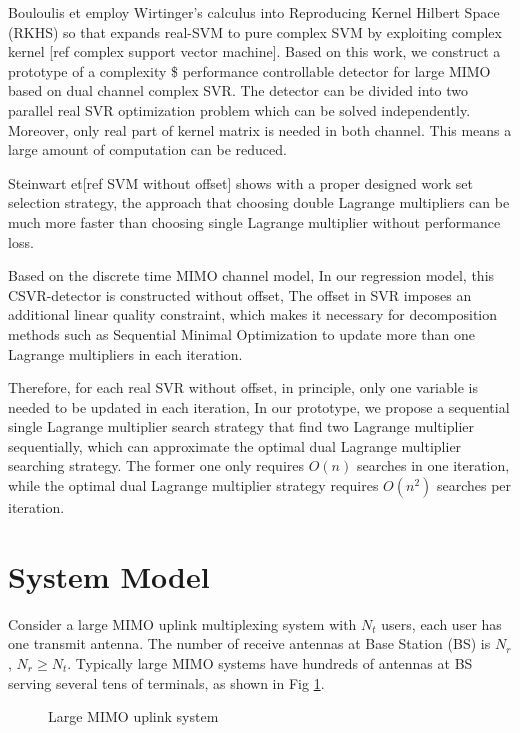 \documentclass[12pt, draftclsnofoot, onecolumn]{IEEEtran}
\begin{document}
  Bouloulis et employ Wirtinger’s calculus into Reproducing Kernel Hilbert Space (RKHS) so that expands real-SVM to pure complex SVM by exploiting complex kernel [ref complex support vector machine]. Based on this work, we construct a prototype of a complexity \$ performance controllable detector for large MIMO based on dual channel complex SVR. The detector can be divided into two parallel real SVR optimization problem which can be solved independently. Moreover, only real part of kernel matrix is needed in both channel. This means a large amount of computation can be reduced. 
  
  Steinwart et[ref SVM without offset] shows with a proper designed work set selection strategy, the approach that choosing double Lagrange multipliers can be much more faster than choosing single Lagrange multiplier without performance loss.
  
Based on the discrete time MIMO channel model, In our regression model, this CSVR-detector is constructed without offset, The offset in SVR imposes an additional linear quality constraint, which makes it necessary for decomposition methods such as Sequential Minimal Optimization to update more than one Lagrange multipliers in each iteration.

Therefore, for each real SVR without offset, in principle, only one variable is needed to be updated in each iteration, In our prototype, we propose a sequential single Lagrange multiplier search strategy that find two Lagrange multiplier sequentially, which can approximate the optimal dual Lagrange multiplier searching strategy. The former one only requires $O(n)$ searches in one iteration, while the optimal dual Lagrange multiplier strategy requires $O(n^{2})$ searches per iteration.  


\section{System Model}\label{system model}
  Consider a large MIMO uplink multiplexing system with $N_{t}$ users, each user has one transmit antenna. The number of receive antennas at Base Station (BS) is $N_{r}$, $N_{r}\geq N_{t}$. Typically large MIMO systems have hundreds of antennas at BS serving several tens of terminals, as shown in Fig {\ref{large MIMO uplink model}}.
  \begin{figure}
  \centering
  \def\svgwidth{\columnwidth}
  
  \caption{Large MIMO uplink system }
  \label{large MIMO uplink model}
  \end{figure}
    
\end{document}
